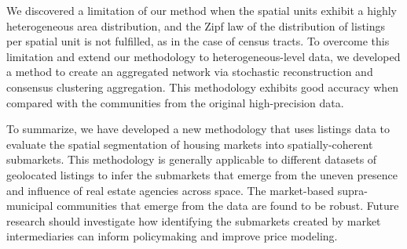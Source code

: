 We discovered a limitation of our method when the spatial units exhibit a highly heterogeneous area distribution, and the Zipf law of the distribution of listings per spatial unit is not fulfilled, as in the case of census tracts. To overcome this limitation and extend our methodology to heterogeneous-level data, we developed a method to create an aggregated network via stochastic reconstruction and consensus clustering aggregation. This methodology exhibits good accuracy when compared with the communities from the original high-precision data.

To summarize, we have developed a new methodology that uses listings data to evaluate the spatial segmentation of housing markets into spatially-coherent submarkets. This methodology is generally applicable to different datasets of geolocated listings to infer the submarkets that emerge from the uneven presence and influence of real estate agencies across space. The market-based supra-municipal communities that emerge from the data are found to be robust. Future research should investigate how identifying the submarkets created by market intermediaries can inform policymaking and improve price modeling.